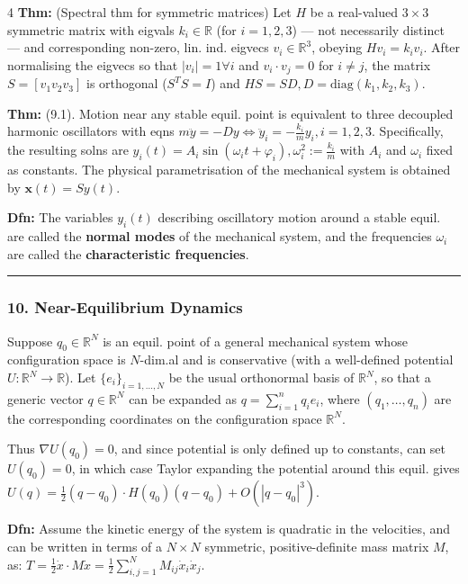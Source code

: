 \documentclass[landscape, 8pt]{extarticle}
\begin{document}
\begin{multicols*}{4}
		\textbf{Thm:} (Spectral thm for symmetric matrices) Let $H$ be a real-valued $3\times 3$ symmetric matrix with eigvals $k_i\in\mathbb{R}$ (for $i=1,2,3$) --- not necessarily distinct --- and corresponding non-zero, lin. ind. eigvecs $v_i\in\mathbb{R}^3$, obeying $Hv_i=k_iv_i$. After normalising the eigvecs so that $|v_i|=1\forall i$ and $v_i\cdot v_j=0$ for $i\neq j$, the matrix $S=[v_1v_2v_3]$ is orthogonal ($S^TS=I$) and
		$
		HS=SD, D=\mathrm{diag}(k_1,k_2,k_3).
		$
		
		\textbf{Thm:} (9.1). Motion near any stable equil. point is equivalent to three decoupled harmonic oscillators with eqns
		$
		m\ddot{y}=-Dy\Leftrightarrow\ddot{y}_i=-\frac{k_i}{m}y_i, i=1,2,3.
		$
		Specifically, the resulting solns are
		$
		y_i(t)=A_i\sin(\omega_i t+\varphi_i),\omega_i^2:=\frac{k_i}{m}
		$
		with $A_i$ and $\omega_i$ fixed as constants. The physical parametrisation of the mechanical system is obtained by $\mathbf{x}(t)=Sy(t)$.
		
		\textbf{Dfn:} The variables $y_i(t)$ describing oscillatory motion around a stable equil. are called the \textbf{normal modes} of the mechanical system, and the frequencies $\omega_i$ are called the \textbf{characteristic frequencies}.
		
		\hrule
		\vspace*{-3pt}
		\subsubsection*{\tiny{10. Near-Equilibrium Dynamics}}
		\vspace*{-5pt}
		
		Suppose $q_0\in\mathbb{R}^N$ is an equil. point of a general mechanical system whose configuration space is $N$-dim.al and is conservative (with a well-defined potential $U:\mathbb{R}^N\to\mathbb{R}$). Let $\{e_i\}_{i=1,\ldots,N}$ be the usual orthonormal basis of $\mathbb{R}^N$, so that a generic vector $q\in\mathbb{R}^N$ can be expanded as $q=\sum_{i=1}^n q_i e_i$, where $(q_1,\ldots,q_n)$ are the corresponding coordinates on the configuration space $\mathbb{R}^N$.
		
		Thus $\nabla U(q_0)=0$, and since potential is only defined up to constants, can set $U(q_0)=0$, in which case Taylor expanding the potential around this equil. gives
		$
		U(q)=\tfrac{1}{2}(q-q_0)\cdot H(q_0)(q-q_0)+O(|q-q_0|^3).
		$
		
		\textbf{Dfn:} Assume the kinetic energy of the system is quadratic in the velocities, and can be written in terms of a $N\times N$ symmetric, positive-definite mass matrix $M$, as:
		$
		T=\frac{1}{2}\dot{x}\cdot M\dot{x}=\frac{1}{2}\sum_{i,j=1}^N M_{ij}\dot{x}_i\dot{x}_j.
		$
		

\end{multicols*}
\end{document}
